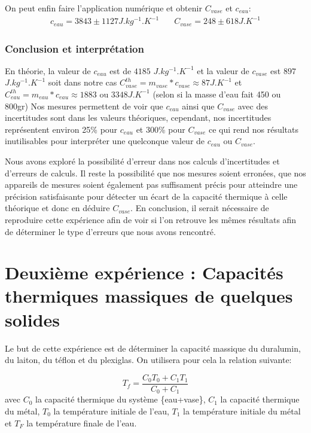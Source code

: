 \documentclass[12pt]{article}
\begin{document}
On peut enfin faire l'application numérique et obtenir $C_{vase}$ et $c_{eau}$:
\begin{align}
	c_{eau} = 3843 \pm 1127 J.kg^{-1}.K^{-1} & \quad C_{vase} = 248 \pm 618 J.K^{-1}
\end{align}


\subsubsection{Conclusion et interprétation}
En théorie, la valeur de $c_{eau}$ est de $4185$ $J.kg^{-1}.K^{-1}$ et la valeur de $c_{vase}$ est $897$ $J.kg^{-1}.K^{-1}$ soit dans notre cas $C_{vase}^{th} = m_{vase} * c_{vase} \approx 87 J.K^{-1}$ et $C_{eau}^{th} = m_{eau} * c_{eau} \approx 1883 \text{ ou } 3348 J.K^{-1}$ (selon si la masse d'eau fait 450 ou 800gr)
Nos mesures permettent de voir que $c_{eau}$ ainsi que $C_{vase}$ avec des incertitudes sont dans les valeurs théoriques, cependant, nos incertitudes représentent environ 25\% pour $c_{eau}$
et 300\% pour $C_{vase}$ ce qui rend nos résultats inutilisables pour interpréter une quelconque valeur de $c_{eau}$ ou $C_{vase}$. 

Nous avons exploré la possibilité d'erreur dans nos calculs d'incertitudes et d'erreurs de calculs. Il reste la possibilité que nos mesures soient erronées, que nos appareils de mesures soient également pas suffisament précis 
pour atteindre une précision satisfaisante pour détecter un écart de la capacité thermique à celle théorique et donc en déduire $C_{vase}$. En conclusion, il serait nécessaire de reproduire cette expérience afin de voir si l'on retrouve les mêmes résultats afin de déterminer le type d'erreurs que nous avons rencontré.

\newpage
\section{Deuxième expérience : Capacités thermiques massiques de quelques solides}

Le but de cette expérience est de déterminer la capacité massique du duralumin, du laiton, du téflon et du plexiglas. On utilisera pour cela la relation suivante:

\begin{equation}
	T_f=\frac{C_0T_0+C_1T_1}{C_0+C_1}
\label{EquationTf}
\end{equation}
avec $C_0$ la capacité thermique du système \{eau+vase\}, $C_1$ la capacité thermique du métal, $T_0$ la température initiale de l'eau, $T_1$ la température initiale du métal et $T_F$ la température finale de l'eau.
\end{document}
